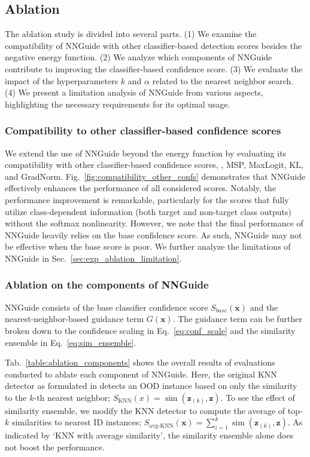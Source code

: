 \documentclass[10pt,twocolumn,letterpaper]{article}
\DeclareMathOperator{\simop}{sim}
\begin{document}
\subsection{Ablation}


The ablation study is divided into several parts. (1) We examine the compatibility of NNGuide with other classifier-based detection scores besides the negative energy function. (2) We analyze which components of NNGuide contribute to improving the classifier-based confidence score. (3) We evaluate the impact of the hyperparameters $k$ and $\alpha$ related to the nearest neighbor search. (4) We present a limitation analysis of NNGuide from various aspects, highlighting the necessary requirements for its optimal usage.

\subsubsection{Compatibility to other classifier-based confidence scores}



We extend the use of NNGuide beyond the energy function by evaluating its compatibility with other classifier-based confidence scores, \ie, MSP, MaxLogit, KL, and GradNorm. Fig.~\ref{fig:compatibility_other_confs} demonstrates that NNGuide effectively enhances the performance of all considered scores.
Notably, the performance improvement is remarkable, particularly for the scores that fully utilize class-dependent information (both target and non-target class outputs) without the softmax nonlinearity. However, we note that the final performance of NNGuide heavily relies on the base confidence score. As such, NNGuide may not be effective when the base score is poor. We further analyze the limitations of NNGuide in Sec.~\ref{sec:exp_ablation_limitation}.


\subsubsection{Ablation on the components of NNGuide}
NNGuide consists of the base classifier confidence score $S_{base}(\mathbf{x})$ and the nearest-neighbor-based guidance term $G(\mathbf{x})$. The guidance term can be further broken down to the confidence scaling in Eq.~\eqref{eq:conf_scale} and the similarity ensemble in Eq.~\eqref{eq:sim_ensemble}.

Tab.~\ref{table:ablation_components} shows the overall results of evaluations conducted to ablate each component of NNGuide. Here, the original KNN detector as formulated in \cite{sun2022out} detects an OOD instance based on only the similarity to the $k$-th nearest neighbor; \ie $S_{\text{KNN}}(x) = \simop (\mathbf{z}_{(k)}, \mathbf{z})$. To see the effect of similarity ensemble, we modify the KNN detector to compute the average of top-$k$ similarities to nearest ID instances; \ie $S_{\text{avg-KNN}}(\mathbf{x}) = \sum_{i=1}^k \simop (\mathbf{z}_{(k)}, \mathbf{z})$.
As indicated by `KNN with average similarity', the similarity ensemble alone does not boost the performance. 
\end{document}
